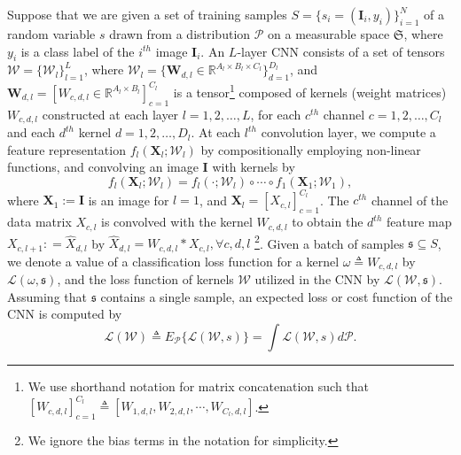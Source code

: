 \documentclass[10pt,journal,compsoc]{IEEEtran}
\theoremstyle{definition}
\theoremstyle{definition}
\theoremstyle{remark}
\theoremstyle{remark}
\theoremstyle{remark}
\begin{document}
Suppose that we are given a set of training samples ${S=\{s_i= (\mathbf{I}_i,y_i) \}_{i=1}^N}$ of a random variable $s$ drawn from a distribution $\mathcal{P}$ on a measurable space $\mathfrak{S}$, where $y_i $ is a class label of the $i^{th}$ image $\mathbf{I}_i$. An $L$-layer CNN consists of a set of tensors $\mathcal{W} = \{\mathcal{W}_l \}_{l=1}^L$, where ${\mathcal{W}_l = \{ \mathbf{W}_{d,l} \in \mathbb{R}^{A_l \times B_l \times C_l} \} _{d=1} ^{D_l}}$, and ${\mathbf{W}_{d,l} = [W_{c,d,l} \in \mathbb{R}^{A_l \times B_l}]_{c=1}^{C_l}}$  is a tensor\footnote{We use shorthand notation for matrix concatenation such that $[W_{c,d,l}  ]_{c=1}^{C_l} \triangleq [W_{1,d,l}, W_{2,d,l}, \cdots,W_{C_l,d,l}]$.} composed of kernels (weight matrices) $W_{c,d,l} $ constructed at each layer ${l=1,2,\ldots,L}$, for each $c^{th}$ channel $c=1,2,\ldots,C_l$ and each $d^{th}$ kernel $d=1,2,\ldots,D_l$. At each $l^{th}$ convolution layer, we compute a feature representation $f_l(\mathbf{X}_l;\mathcal{W}_l)$ by compositionally employing non-linear functions, and convolving an image $\mathbf{I}$ with kernels by  
\begin{equation}
f_l(\mathbf{X}_l;\mathcal{W}_{l}) = f_l(\cdot;\mathcal{W}_l) \circ  \cdots \circ f_1(\mathbf{X}_1;\mathcal{W}_{1}),
\label{eq:comp_rep}
\end{equation}
where ${\mathbf{X}_1 := \mathbf{I}}$ is an image for ${l=1}$, and $\mathbf{X}_{l} = [ X_{c,l}]_{c=1}^{C_l}$. The $c^{th}$ channel of the data matrix $X_{c,l}$ is convolved with the kernel ${W}_{c,d,l}$ to obtain the $d^{th}$ feature map ${ X_{c,l+1} : = \hat{X}_{d,l}}$ by $\hat{X}_{d,l} = {W}_{c,d,l} \ast X_{c,l}, \forall c, d, l$ \footnote{We ignore the bias terms in the notation for simplicity.}. Given a batch of samples $\mathfrak{s} \subseteq S$, we denote a value of a classification loss function for a kernel $\omega \triangleq W_{c,d,l}$ by $\mathcal{L}(\omega,\mathfrak{s})$, and the loss function of kernels $\mathcal{W}$ utilized in the CNN by $\mathcal{L}(\mathcal{W},\mathfrak{s})$. Assuming that  $\mathfrak{s}$ contains a single sample, an expected loss or cost function of the CNN  is computed by
\begin{equation}
\mathcal{L}(\mathcal{W}) \triangleq E_{\mathcal{P}} \{ {\mathcal{L}}(\mathcal{W},s) \} = \int {\mathcal{L}}(\mathcal{W},s) d \mathcal{P}.
\label{eq:expected_cost}
\end{equation}
\end{document}
